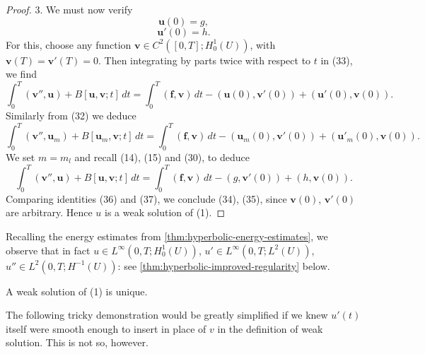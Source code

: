 \begin{proof}
3. We must now verify
\[
\mathbf{u}(0) = g, \tag{34}
\]
\[
\mathbf{u}'(0) = h. \tag{35}
\]
For this, choose any function $\mathbf{v} \in C^2([0,T]; H^1_0(U))$, with $\mathbf{v}(T) = \mathbf{v}'(T) = 0$. Then integrating by parts twice with respect to $t$ in (33), we find
\[
\int_0^T (\mathbf{v}'', \mathbf{u}) + B[\mathbf{u}, \mathbf{v}; t] \, dt = \int_0^T (\mathbf{f}, \mathbf{v}) \, dt - (\mathbf{u}(0), \mathbf{v}'(0)) + (\mathbf{u}'(0), \mathbf{v}(0)). \tag{36}
\]
Similarly from (32) we deduce
\[
\int_0^T (\mathbf{v}'', \mathbf{u}_m) + B[\mathbf{u}_m, \mathbf{v}; t] \, dt = \int_0^T (\mathbf{f}, \mathbf{v}) \, dt - (\mathbf{u}_m(0), \mathbf{v}'(0)) + (\mathbf{u}'_m(0), \mathbf{v}(0)).
\]
We set $m = m_l$ and recall (14), (15) and (30), to deduce
\[
\int_0^T (\mathbf{v}'', \mathbf{u}) + B[\mathbf{u}, \mathbf{v}; t] \, dt = \int_0^T (\mathbf{f}, \mathbf{v}) \, dt - (g, \mathbf{v}'(0)) + (h, \mathbf{v}(0)). \tag{37}
\]
Comparing identities (36) and (37), we conclude (34), (35), since $\mathbf{v}(0)$, $\mathbf{v}'(0)$ are arbitrary. Hence $u$ is a weak solution of (1).
\end{proof}

\begin{remark}
\label{rem:hyperbolic-existence-remark}
Recalling the energy estimates from \cref{thm:hyperbolic-energy-estimates}, we observe that in fact $u \in L^\infty(0,T; H^1_0(U))$, $u' \in L^\infty(0,T; L^2(U))$, $u'' \in L^2(0,T; H^{-1}(U))$: see \cref{thm:hyperbolic-improved-regularity} below.
\end{remark}

\begin{theorem}
\label{thm:hyperbolic-uniqueness-weak-solution}
A weak solution of (1) is unique.
\end{theorem}

\begin{remark}
\label{rem:hyperbolic-uniqueness-remark}
The following tricky demonstration would be greatly simplified if we knew $u'(t)$ itself were smooth enough to insert in place of $v$ in the definition of weak solution. This is not so, however.
\end{remark}

